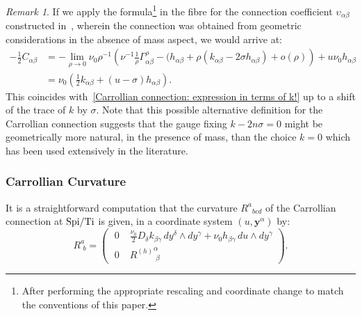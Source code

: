 \documentclass[a4paper, 10pt]{article}
\theoremstyle{remark}
\newtheorem{remark}{Remark}[section]
\newcommand{\Ti}{\textnormal{Ti}}
\newcommand{\Spi}{\textnormal{Spi}}
\newcommand{\y}{\bm{y}}
\begin{document}
\begin{remark}
If we apply the formula\footnote{After performing the appropriate rescaling and coordinate change to match the conventions of this paper.} in the fibre for the connection coefficient $\upsilon_{\alpha\beta}$ constructed in~\cite{Borthwick:2024wfn}, wherein the connection was obtained from geometric considerations in the absence of mass aspect, we would arrive at:
\[\begin{aligned} -\frac{1}{2}C_{\alpha\beta}&=-\lim_{\rho \to 0}\nu_0\rho^{-1}\left(\nu^{-1}\frac{1}{\rho}\Gamma^\rho_{\alpha\beta} - (h_{\alpha\beta} + \rho(k_{\alpha\beta}-2\sigma h_{\alpha\beta})+o(\rho)\right)+ u\nu_0h_{\alpha\beta}\\&= \nu_0\left(\frac{1}{2}k_{\alpha\beta} + (u-\sigma) h_{\alpha\beta}\right).\end{aligned}\]
This coincides with~\eqref{Carrollian connection: expression in terms of k!} up to a shift of the trace of $k$ by $\sigma$. Note that this possible alternative definition for the Carrollian connection suggests that the gauge fixing $k-2n \sigma =0$ might be geometrically more natural, in the presence of mass, than the choice $k=0$ which has been used extensively in the literature.
\end{remark}

\subsubsection{Carrollian Curvature}
It is a straightforward computation that the curvature $R^{a}{}_{bcd}$ of the Carrollian connection at $\Spi/\Ti$ is given, in a coordinate system $(u,\y^{\alpha})$ by:
\begin{equation*}\label{Carrollian connection: Carrollian curvature}
R^a_{\,\,b}=\begin{pmatrix}\;0\; & \frac{\nu_0}{2} D_\delta k_{\beta\gamma}\,dy^\delta\wedge dy^\gamma + \nu_0h_{\beta\gamma}\, du\wedge dy^\gamma \\[0.2em] \;0\; & {R^{(h)}}^\alpha_{\,\,\beta}  \end{pmatrix}.
\end{equation*}
\end{document}
